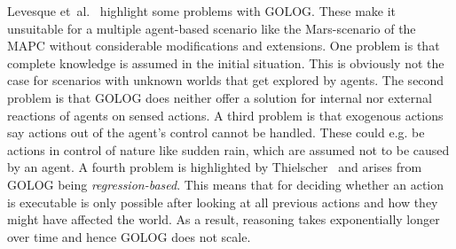 Levesque et~al.~\cite{levesque_golog:_1997} highlight some problems with GOLOG. These make it unsuitable for a multiple agent-based scenario like the Mars-scenario of the MAPC without considerable modifications and extensions. One problem is that complete knowledge is assumed in the initial situation. This is obviously not the case for scenarios with unknown worlds that get explored by agents. The second problem is that GOLOG does neither offer a solution for internal nor external reactions of agents on sensed actions. A third problem is that exogenous actions say actions out of the agent's control cannot be handled. These could e.g. be actions in control of nature like sudden rain, which are assumed not to be caused by an agent. A fourth problem is highlighted by Thielscher~\cite{thielscher_flux:_2005} and arises from GOLOG being \emph{regression-based}. This means that for deciding whether an action is executable is only possible after looking at all previous actions and how they might have affected the world. As a result, reasoning takes exponentially longer over time and hence GOLOG does not scale.
